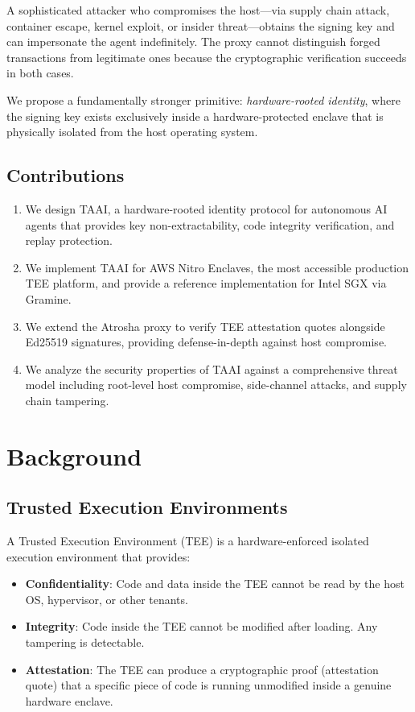 \documentclass[conference]{IEEEtran}
\begin{document}
A sophisticated attacker who compromises the host---via supply chain attack, container escape, kernel exploit, or insider threat---obtains the signing key and can impersonate the agent indefinitely. The proxy cannot distinguish forged transactions from legitimate ones because the cryptographic verification succeeds in both cases.

We propose a fundamentally stronger primitive: \textit{hardware-rooted identity}, where the signing key exists exclusively inside a hardware-protected enclave that is physically isolated from the host operating system.

\subsection{Contributions}

\begin{enumerate}
    \item We design TAAI, a hardware-rooted identity protocol for autonomous AI agents that provides key non-extractability, code integrity verification, and replay protection.
    \item We implement TAAI for AWS Nitro Enclaves, the most accessible production TEE platform, and provide a reference implementation for Intel SGX via Gramine.
    \item We extend the Atrosha proxy to verify TEE attestation quotes alongside Ed25519 signatures, providing defense-in-depth against host compromise.
    \item We analyze the security properties of TAAI against a comprehensive threat model including root-level host compromise, side-channel attacks, and supply chain tampering.
\end{enumerate}

\section{Background}

\subsection{Trusted Execution Environments}

A Trusted Execution Environment (TEE) is a hardware-enforced isolated execution environment that provides:

\begin{itemize}
    \item \textbf{Confidentiality}: Code and data inside the TEE cannot be read by the host OS, hypervisor, or other tenants.
    \item \textbf{Integrity}: Code inside the TEE cannot be modified after loading. Any tampering is detectable.
    \item \textbf{Attestation}: The TEE can produce a cryptographic proof (attestation quote) that a specific piece of code is running unmodified inside a genuine hardware enclave.
\end{itemize}
\end{document}
